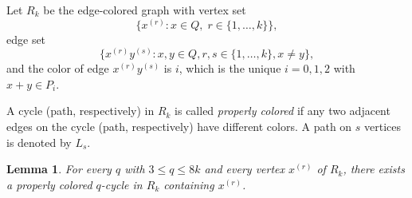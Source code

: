 \documentclass[12pt]{article}
\newtheorem{lemma}{Lemma}
\begin{document}
Let $R_k$ be the edge-colored graph with vertex set
\[
\{x^{(r)}:x\in Q,\; r\in\{1,\ldots,k\}\},
\]
edge set 
\[
\{x^{(r)}y^{(s)}: x,y\in Q, r,s\in \{1,\dots, k\}, x\ne y\},
\]
 and the color of  edge  $x^{(r)}y^{(s)}$ is $i$, which is the unique $i=0,1,2$ with $x+y\in P_i$. 

A cycle (path, respectively) in $R_k$ is called \emph{properly colored} if any two adjacent edges on the cycle (path, respectively) have different colors. A path on $s$ vertices is denoted by $L_s$. 


\begin{lemma}\label{lem:proper-cycles}
For every $q$ with $3\le q\le 8k$ and every vertex $x^{(r)}$ of $R_k$, there exists a properly colored $q$-cycle in $R_k$ containing $x^{(r)}$.
\end{lemma}
\end{document}
